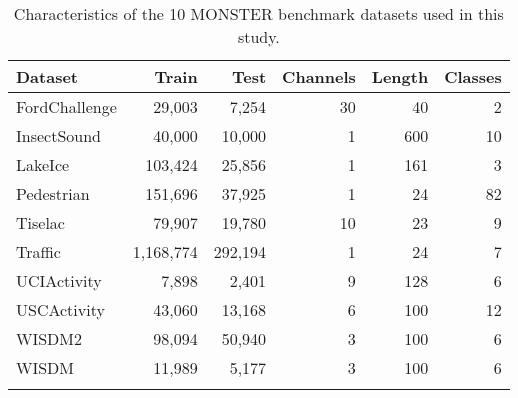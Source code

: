 \begin{table}[!htb]
\caption{Characteristics of the 10 MONSTER benchmark datasets used in this study.}\label{tab:dataset_characteristics}
\centering
\begin{tabular}{lrrrrr}
\toprule
Dataset & Train & Test & Channels & Length & Classes \\
\midrule
FordChallenge        & 29,003 & 7,254 & 30 & 40 & 2 \\
InsectSound          & 40,000 & 10,000 & 1 & 600 & 10 \\
LakeIce              & 103,424 & 25,856 & 1 & 161 & 3 \\
Pedestrian           & 151,696 & 37,925 & 1 & 24 & 82 \\
Tiselac              & 79,907 & 19,780 & 10 & 23 & 9 \\
Traffic              & 1,168,774 & 292,194 & 1 & 24 & 7 \\
UCIActivity          & 7,898 & 2,401 & 9 & 128 & 6 \\
USCActivity          & 43,060 & 13,168 & 6 & 100 & 12 \\
WISDM2               & 98,094 & 50,940 & 3 & 100 & 6 \\
WISDM                & 11,989 & 5,177 & 3 & 100 & 6 \\
\botrule
\end{tabular}
\end{table}